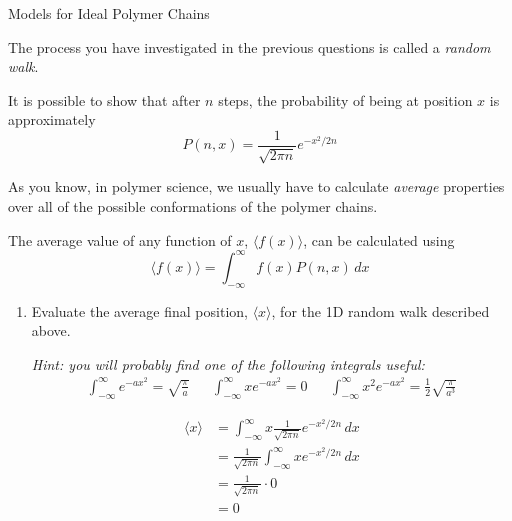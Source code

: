 \begin{activity}{Models for Ideal Polymer Chains}
\begin{ctqs}
\end{ctqs}

\begin{infobox}
	
	The process you have investigated in the previous questions is called a \emph{random walk}.
	
	It is possible to show that after $n$ steps, the probability of being at position $x$ is approximately
	\begin{equation*}
		P(n,x) = \frac{1}{\sqrt{2\pi n}}e^{-x^2/2n}
	\end{equation*}
	
\end{infobox}

\begin{ctqs}

	\question As you know, in polymer science, we usually have to calculate \emph{average} properties over all of the possible conformations of the polymer chains.
	
		The average value of any function of $x$, $\langle f(x)\rangle$, can be calculated using
		\begin{equation*}
			\langle f(x) \rangle = \int_{-\infty}^\infty f(x) P(n,x)\,dx
		\end{equation*}
		
		\begin{enumerate}
			\item Evaluate the average final position, $\langle x \rangle$, for the 1D random walk described above.
			
				\emph{Hint: you will probably find one of the following integrals useful:}
				\begin{align*}
					\int_{-\infty}^\infty e^{-a x^2} = \sqrt{\frac{\pi}{a}} && \int_{-\infty}^\infty x e^{-a x^2} = 0 && \int_{-\infty}^\infty x^2 e^{-a x^2} = \frac{1}{2}\sqrt{\frac{\pi}{a^3}}
				\end{align*}
				
				\begin{solution}[1.5in]{}
					\begin{align*}
						\langle x \rangle &= \int_{-\infty}^\infty x \frac{1}{\sqrt{2\pi n}}e^{-x^2/2n}\, dx\\
						&= \frac{1}{\sqrt{2\pi n}} \int_{-\infty}^\infty x e^{-x^2/2n}\, dx\\
						&= \frac{1}{\sqrt{2\pi n}} \cdot 0\\
						&= 0
					\end{align*}
				\end{solution}
				

\end{enumerate}
\end{ctqs}
\end{activity}
